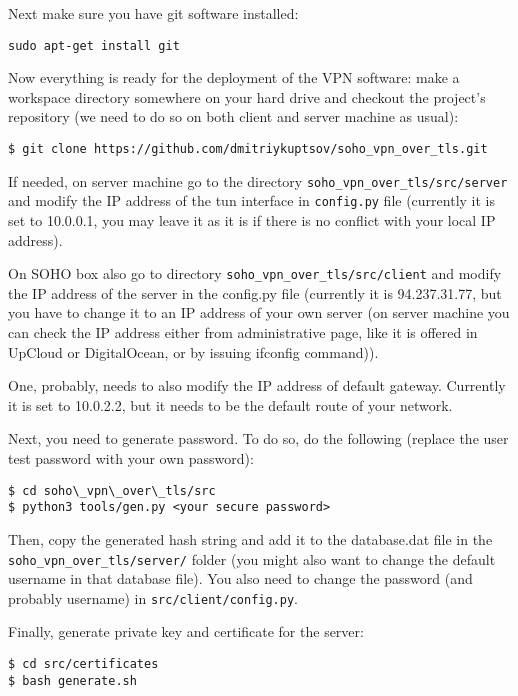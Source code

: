 Next make sure you have git software 
installed:

\texttt{sudo apt-get install git}

Now everything is ready for the deployment 
of the VPN software: make a workspace directory 
somewhere on your hard drive and checkout the 
project's repository (we need to do so on both 
client and server machine as usual):

\begin{verbatim}
$ git clone https://github.com/dmitriykuptsov/soho_vpn_over_tls.git
\end{verbatim}

If needed, on server machine go to the directory 
\texttt{soho\_vpn\_over\_tls/src/server} and modify the IP address 
of the tun interface in \texttt{config.py} file (currently 
it is set to 10.0.0.1, you may leave it as it is 
if there is no conflict with your local IP address).

On SOHO box also go to directory 
\texttt{soho\_vpn\_over\_tls/src/client}
and modify the IP address of the server in the config.py 
file (currently it is 94.237.31.77, but you have to change 
it to an IP address of your own server (on server machine 
you can check the IP address either from administrative page, 
like it is offered in UpCloud or DigitalOcean, or by issuing 
ifconfig command)).

One, probably, needs to also modify the IP address of default 
gateway. Currently it is set to 10.0.2.2, but it needs to be the 
default route of your network.

Next, you need to generate password. To do so, 
do the following (replace the user test password with your own 
password):

\begin{verbatim}
$ cd soho\_vpn\_over\_tls/src
$ python3 tools/gen.py <your secure password>
\end{verbatim}

Then, copy the generated hash string and add it to the 
database.dat file in the \texttt{soho\_vpn\_over\_tls/server/} folder (you 
might also want to change the default username in that 
database file). You also need to change the password (and probably 
username) in \texttt{src/client/config.py}.

Finally, generate private key and certificate for the 
server:

\begin{verbatim}
$ cd src/certificates
$ bash generate.sh
\end{verbatim}


